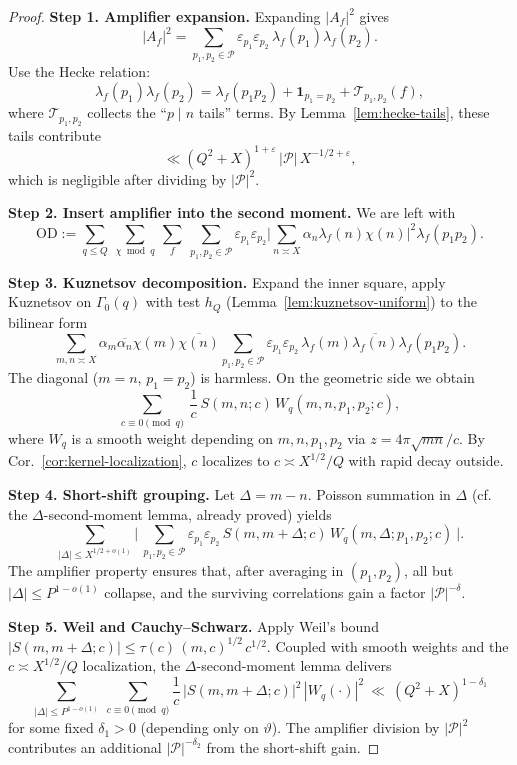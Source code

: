 \documentclass[11pt]{article}
\theoremstyle{definition}
\theoremstyle{remark}
\numberwithin{equation}{part}
\begin{document}
\begin{proof}
	\textbf{Step 1. Amplifier expansion.}
	Expanding $|A_f|^2$ gives
	\[
		|A_f|^2
		=\sum_{p_1,p_2\in\mathcal P}\varepsilon_{p_1}\varepsilon_{p_2}\,\lambda_f(p_1)\lambda_f(p_2).
	\]
	Use the Hecke relation:
	\[
		\lambda_f(p_1)\lambda_f(p_2)
		=\lambda_f(p_1p_2)+\mathbf1_{p_1=p_2}+\mathcal T_{p_1,p_2}(f),
	\]
	where $\mathcal T_{p_1,p_2}$ collects the ``$p\mid n$ tails'' terms.
	By Lemma~\ref{lem:hecke-tails}, these tails contribute
	\[
		\ll (Q^2+X)^{1+\varepsilon}\,|\mathcal P|\,X^{-1/2+\varepsilon},
	\]
	which is negligible after dividing by $|\mathcal P|^2$.

	\smallskip
	\textbf{Step 2. Insert amplifier into the second moment.}
	We are left with
	\[
		\mathrm{OD}
		:=\sum_{q\le Q}\ \sum_{\chi\bmod q}\ \sum_f
		\ \sum_{p_1,p_2\in\mathcal P}\varepsilon_{p_1}\varepsilon_{p_2}
		\Big|\sum_{n\asymp X}\alpha_n\lambda_f(n)\chi(n)\Big|^2 \lambda_f(p_1p_2).
	\]

	\smallskip
	\textbf{Step 3. Kuznetsov decomposition.}
	Expand the inner square, apply Kuznetsov on $\Gamma_0(q)$ with test $h_Q$ (Lemma~\ref{lem:kuznetsov-uniform}) to the bilinear form
	\[
		\sum_{m,n\asymp X} \alpha_m\overline{\alpha_n}\chi(m)\overline{\chi(n)}
		\sum_{p_1,p_2\in\mathcal P}\varepsilon_{p_1}\varepsilon_{p_2}\,
		\lambda_f(m)\overline{\lambda_f(n)}\lambda_f(p_1p_2).
	\]
	The diagonal ($m=n$, $p_1=p_2$) is harmless.
	On the geometric side we obtain
	\[
		\sum_{c\equiv0\pmod q}\ \frac{1}{c}\,
		S(m,n;c)\,W_{q}(m,n,p_1,p_2;c),
	\]
	where $W_q$ is a smooth weight depending on $m,n,p_1,p_2$ via $z=4\pi\sqrt{mn}/c$.
	By Cor.~\ref{cor:kernel-localization}, $c$ localizes to $c\asymp X^{1/2}/Q$ with rapid decay outside.

	\smallskip
	\textbf{Step 4. Short-shift grouping.}
	Let $\Delta=m-n$.
	Poisson summation in $\Delta$ (cf. the $\Delta$-second-moment lemma, already proved) yields
	\[
		\sum_{|\Delta|\le X^{1/2+o(1)}}
		\Big|\ \sum_{p_1,p_2\in\mathcal P}\varepsilon_{p_1}\varepsilon_{p_2}\,
		S(m,m+\Delta;c)\,W_q(m,\Delta;p_1,p_2;c)\ \Big|.
	\]
	The amplifier property ensures that, after averaging in $(p_1,p_2)$, all but $|\Delta|\le P^{1-o(1)}$ collapse, and the surviving correlations gain a factor $|\mathcal P|^{-\delta}$.

	\smallskip
	\textbf{Step 5. Weil and Cauchy–Schwarz.}
	Apply Weil's bound $|S(m,m+\Delta;c)|\le\tau(c)\,(m,c)^{1/2}\,c^{1/2}$.
	Coupled with smooth weights and the $c\asymp X^{1/2}/Q$ localization, the $\Delta$-second-moment lemma delivers
	\[
		\sum_{|\Delta|\le P^{1-o(1)}}\ \sum_{c\equiv0\pmod q}
		\frac{1}{c}\,|S(m,m+\Delta;c)|^2\,|W_q(\cdot)|^2
		\ \ll\ (Q^2+X)^{1-\delta_1}
	\]
	for some fixed $\delta_1>0$ (depending only on $\vartheta$).
	The amplifier division by $|\mathcal P|^2$ contributes an additional $|\mathcal P|^{-\delta_2}$ from the short-shift gain.


\end{proof}
\end{document}
